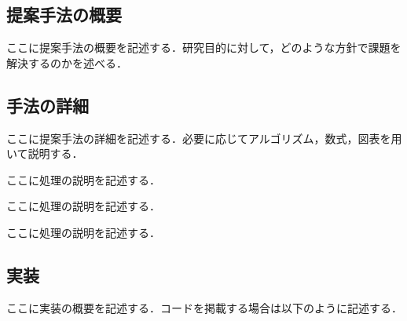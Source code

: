\subsection{提案手法の概要}
ここに提案手法の概要を記述する．研究目的に対して，どのような方針で課題を解決するのかを述べる．

\subsection{手法の詳細}
ここに提案手法の詳細を記述する．必要に応じてアルゴリズム，数式，図表を用いて説明する．

\begin{algorithm_step}
    \item[Step 1)] ここに処理の説明を記述する．
    \item[Step 2)] ここに処理の説明を記述する．
    \item[Step 3)] ここに処理の説明を記述する．
\end{algorithm_step}

\subsection{実装}
ここに実装の概要を記述する．コードを掲載する場合は以下のように記述する．

